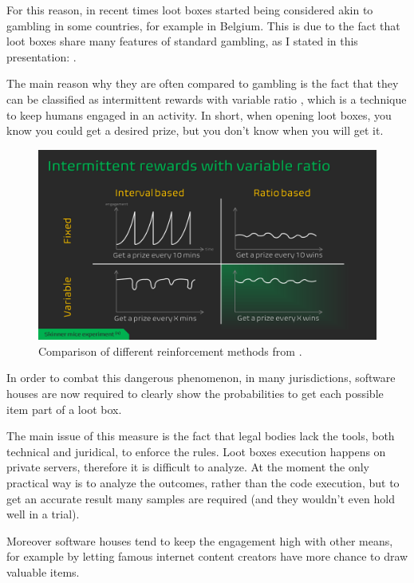 \documentclass[12pt]{article}
\begin{document}
For this reason, in recent times loot boxes started being considered akin to gambling in some countries, for example in Belgium. This is due to the fact that loot boxes share many features of standard gambling, as I stated in this presentation: \cite{lootboxes_computer_ethics}.

The main reason why they are often compared to gambling is the fact that they can be classified as intermittent rewards with variable ratio \cite{intermittent_reinforcement}, which is a technique to keep humans engaged in an activity. 
In short, when opening loot boxes, you know you could get a desired prize, but you don't know when you will get it.
\begin{figure}[h]
    \centering
    \includegraphics[width=\textwidth]{intermittent_rewards} 
    \caption{Comparison of different reinforcement methods from \cite{lootboxes_computer_ethics}.}
    \label{figure:intermittent_rewards}
\end{figure}

In order to combat this dangerous phenomenon, in many jurisdictions, software houses are now required to clearly show the probabilities to get each possible item part of a loot box.

The main issue of this measure is the fact that legal bodies lack the tools, both technical and juridical, to enforce the rules. Loot boxes execution happens on private servers, therefore it is difficult to analyze. At the moment the only practical way is to analyze the outcomes, rather than the code execution, but to get an accurate result many samples are required (and they wouldn't even hold well in a trial).

Moreover software houses tend to keep the engagement high with other means, for example by letting famous internet content creators have more chance to draw valuable items.
\end{document}
